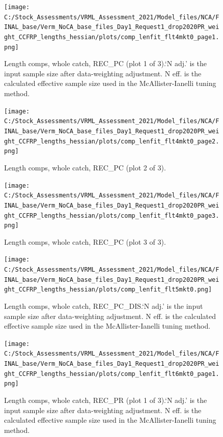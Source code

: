 \documentclass[11pt,
  english,
]{article}
\begin{document}
\begin{figure}
\centering
\texttt{[image: C:/Stock\_Assessments/VRML\_Assessment\_2021/Model\_files/NCA/FINAL\_base/Verm\_NoCA\_base\_files\_Day1\_Request1\_drop2020PR\_weight\_CCFRP\_lengths\_hessian/plots/comp\_lenfit\_flt4mkt0\_page1.png]}
\caption{Length comps, whole catch, REC\_PC (plot 1 of 3).`N adj.' is the input sample size after data-weighting adjustment. N eff. is the calculated effective sample size used in the McAllister-Ianelli tuning method.\label{fig:comp_lenfit_flt4mkt0_page1}}
\end{figure}

\begin{figure}
\centering
\texttt{[image: C:/Stock\_Assessments/VRML\_Assessment\_2021/Model\_files/NCA/FINAL\_base/Verm\_NoCA\_base\_files\_Day1\_Request1\_drop2020PR\_weight\_CCFRP\_lengths\_hessian/plots/comp\_lenfit\_flt4mkt0\_page2.png]}
\caption{Length comps, whole catch, REC\_PC (plot 2 of 3).\label{fig:comp_lenfit_flt4mkt0_page2}}
\end{figure}

\begin{figure}
\centering
\texttt{[image: C:/Stock\_Assessments/VRML\_Assessment\_2021/Model\_files/NCA/FINAL\_base/Verm\_NoCA\_base\_files\_Day1\_Request1\_drop2020PR\_weight\_CCFRP\_lengths\_hessian/plots/comp\_lenfit\_flt4mkt0\_page3.png]}
\caption{Length comps, whole catch, REC\_PC (plot 3 of 3).\label{fig:comp_lenfit_flt4mkt0_page3}}
\end{figure}

\begin{figure}
\centering
\texttt{[image: C:/Stock\_Assessments/VRML\_Assessment\_2021/Model\_files/NCA/FINAL\_base/Verm\_NoCA\_base\_files\_Day1\_Request1\_drop2020PR\_weight\_CCFRP\_lengths\_hessian/plots/comp\_lenfit\_flt5mkt0.png]}
\caption{Length comps, whole catch, REC\_PC\_DIS.`N adj.' is the input sample size after data-weighting adjustment. N eff. is the calculated effective sample size used in the McAllister-Ianelli tuning method.\label{fig:comp_lenfit_flt5mkt0}}
\end{figure}

\begin{figure}
\centering
\texttt{[image: C:/Stock\_Assessments/VRML\_Assessment\_2021/Model\_files/NCA/FINAL\_base/Verm\_NoCA\_base\_files\_Day1\_Request1\_drop2020PR\_weight\_CCFRP\_lengths\_hessian/plots/comp\_lenfit\_flt6mkt0\_page1.png]}
\caption{Length comps, whole catch, REC\_PR (plot 1 of 3).`N adj.' is the input sample size after data-weighting adjustment. N eff. is the calculated effective sample size used in the McAllister-Ianelli tuning method.\label{fig:comp_lenfit_flt6mkt0_page1}}
\end{figure}
\end{document}
